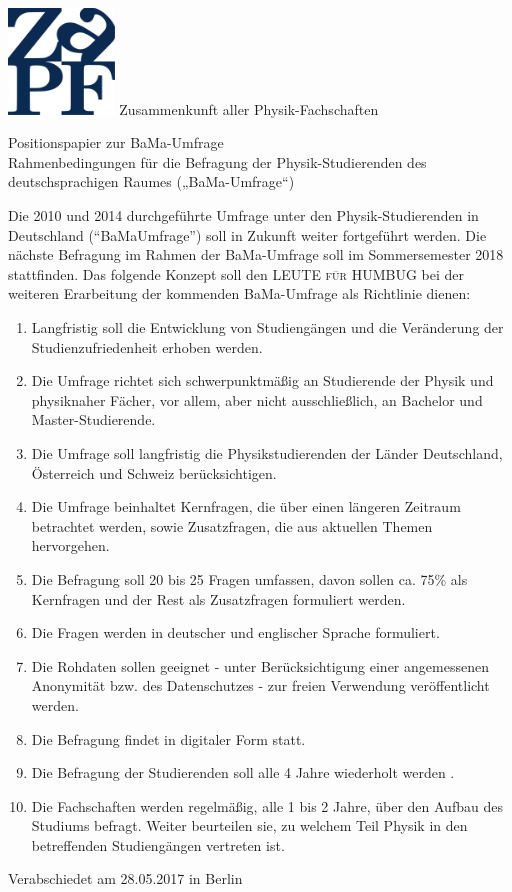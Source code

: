\documentclass[DIV=calc]{scrartcl}
\begin{document}
    \hspace{0.87\textwidth}
    \begin{minipage}{120pt}
        \vspace{-1.8cm}
        \includegraphics[width=80pt]{logo.pdf}
        \centering
        \small Zusammenkunft aller Physik-Fachschaften
    \end{minipage}
    \begin{center}
        \huge{Positionspapier zur BaMa-Umfrage}\vspace{.25\baselineskip}\\ \large{Rahmenbedingungen für die Befragung der Physik-Studierenden des deutschsprachigen Raumes
(„BaMa-Umfrage“)} \\
        \normalsize
    \end{center}
    \vspace{1cm}    
Die 2010 und 2014 durchgeführte Umfrage unter den Physik-Studierenden in Deutschland ("`BaMaUmfrage"') soll in Zukunft weiter 
fortgeführt werden. Die nächste Befragung im Rahmen der BaMa-Umfrage soll im Sommersemester 2018 stattfinden. Das folgende Konzept soll den \textsc{LEUTE für HUMBUG} bei der weiteren Erarbeitung der kommenden BaMa-Umfrage als Richtlinie dienen:
\begin{enumerate}
\item Langfristig soll die Entwicklung von Studiengängen und die Veränderung der Studienzufriedenheit erhoben werden.
\item Die Umfrage richtet sich schwerpunktmäßig an Studierende der Physik und physiknaher Fächer, vor allem, aber nicht 
ausschließlich, an Bachelor und Master-Studierende.
\item Die Umfrage soll langfristig die Physikstudierenden der Länder Deutschland, Österreich und Schweiz berücksichtigen.
\item Die Umfrage beinhaltet Kernfragen, die über einen längeren Zeitraum betrachtet werden, sowie Zusatzfragen, die aus 
aktuellen Themen hervorgehen.
\item Die Befragung soll 20 bis 25 Fragen umfassen, davon sollen ca. 75\% als Kernfragen und der Rest als Zusatzfragen 
formuliert werden.
\item Die Fragen werden in deutscher und englischer Sprache formuliert.
\item Die Rohdaten sollen geeignet - unter Berücksichtigung einer angemessenen Anonymität bzw. des Datenschutzes - zur freien 
Verwendung veröffentlicht werden.
\item Die Befragung findet in digitaler Form statt.
\item Die Befragung der Studierenden soll alle 4 Jahre wiederholt werden .
\item Die Fachschaften werden regelmäßig, alle 1 bis 2 Jahre, über den Aufbau des Studiums befragt. Weiter beurteilen sie, zu 
welchem Teil Physik in den betreffenden Studiengängen vertreten ist.
\end{enumerate}
\vspace{-0.5\baselineskip}
    \begin{flushright}
        Verabschiedet am 28.05.2017 in Berlin
    \end{flushright}
\end{document}
